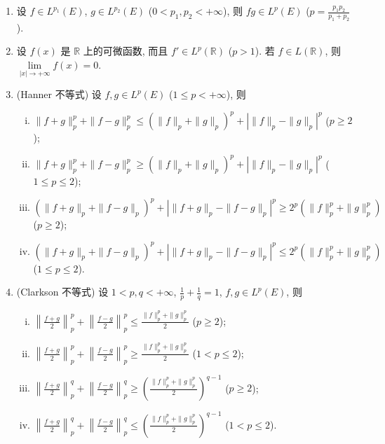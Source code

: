\documentclass[../../main.tex]{subfiles}%
\begin{document}
\begin{proposition}
\begin{enumerate}[(1)]
\item 设 $f\in L^{p_1}(E)$, $g\in L^{p_2}(E)$ ($0<p_1,p_2<+\infty$), 则 $fg\in L^p(E)$ ($p=\frac{p_1p_2}{p_1+p_2}$).

\item 设 $f(x)$ 是 $\mathbb{R}$ 上的可微函数, 而且 $f'\in L^p(\mathbb{R})$ ($p>1$). 若 $f\in L(\mathbb{R})$, 则 $\lim\limits_{|x|\to+\infty} f(x)=0$.

\item (Hanner 不等式) 设 $f,g\in L^p(E)$ ($1\leqslant p<+\infty$), 则
\begin{enumerate}[(i)]
\item $\|f+g\|_p^p + \|f-g\|_p^p \leqslant (\|f\|_p + \|g\|_p)^p + |\|f\|_p - \|g\|_p|^p$ ($p\geqslant2$);
\item $\|f+g\|_p^p + \|f-g\|_p^p \geqslant (\|f\|_p + \|g\|_p)^p + |\|f\|_p - \|g\|_p|^p$ ($1\leqslant p\leqslant2$);
\item $(\|f+g\|_p + \|f-g\|_p)^p + |\|f+g\|_p - \|f-g\|_p|^p \geqslant 2^p (\|f\|_p^p + \|g\|_p^p)$ ($p\geqslant2$);
\item $(\|f+g\|_p + \|f-g\|_p)^p + |\|f+g\|_p - \|f-g\|_p|^p \leqslant 2^p (\|f\|_p^p + \|g\|_p^p)$ ($1\leqslant p\leqslant2$).
\end{enumerate}

\item (Clarkson 不等式) 设 $1<p,q<+\infty$, $\frac{1}{p}+\frac{1}{q}=1$, $f,g\in L^p(E)$, 则
\begin{enumerate}[(i)]
\item $\left\| \frac{f+g}{2} \right\|_p^p + \left\| \frac{f-g}{2} \right\|_p^p \leqslant \frac{\|f\|_p^p + \|g\|_p^p}{2}$ ($p\geqslant2$);
\item $\left\| \frac{f+g}{2} \right\|_p^p + \left\| \frac{f-g}{2} \right\|_p^p \geqslant \frac{\|f\|_p^p + \|g\|_p^p}{2}$ ($1<p\leqslant2$);
\item $\left\| \frac{f+g}{2} \right\|_p^q + \left\| \frac{f-g}{2} \right\|_p^q \geqslant \left( \frac{\|f\|_p^p + \|g\|_p^p}{2} \right)^{q-1}$ ($p\geqslant2$);
\item $\left\| \frac{f+g}{2} \right\|_p^q + \left\| \frac{f-g}{2} \right\|_p^q \leqslant \left( \frac{\|f\|_p^p + \|g\|_p^p}{2} \right)^{q-1}$ ($1<p\leqslant2$).
\end{enumerate}
\end{enumerate}
\end{proposition}
\end{document}

